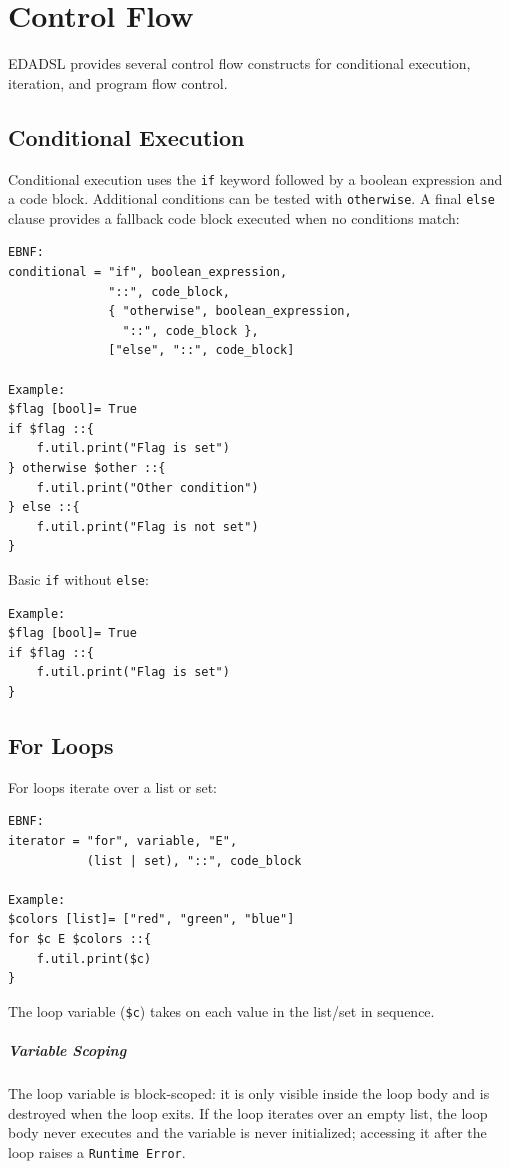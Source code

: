 \chapter{Control Flow}
EDADSL provides several control flow constructs for conditional execution, iteration, and program flow control.

\section{Conditional Execution}
Conditional execution uses the \texttt{if} keyword followed by a boolean expression and a code block. Additional conditions can be tested with \texttt{otherwise}. A final \texttt{else} clause provides a fallback code block executed when no conditions match:
\begin{verbatim}
EBNF:
conditional = "if", boolean_expression, 
              "::", code_block,
              { "otherwise", boolean_expression, 
                "::", code_block },
              ["else", "::", code_block]

Example:
$flag [bool]= True
if $flag ::{
    f.util.print("Flag is set")
} otherwise $other ::{
    f.util.print("Other condition")
} else ::{
    f.util.print("Flag is not set")
}
\end{verbatim}

Basic \texttt{if} without \texttt{else}:
\begin{verbatim}
Example:
$flag [bool]= True
if $flag ::{
    f.util.print("Flag is set")
}
\end{verbatim}

\section{For Loops}
For loops iterate over a list or set:
\begin{verbatim}
EBNF:
iterator = "for", variable, "E", 
           (list | set), "::", code_block

Example:
$colors [list]= ["red", "green", "blue"]
for $c E $colors ::{
    f.util.print($c)
}
\end{verbatim}
The loop variable (\texttt{\$c}) takes on each value in the list/set in sequence.

\paragraph{Variable Scoping}
The loop variable is block-scoped: it is only visible inside the loop body and is destroyed when the loop exits. If the loop iterates over an empty list, the loop body never executes and the variable is never initialized; accessing it after the loop raises a \texttt{Runtime Error}.


